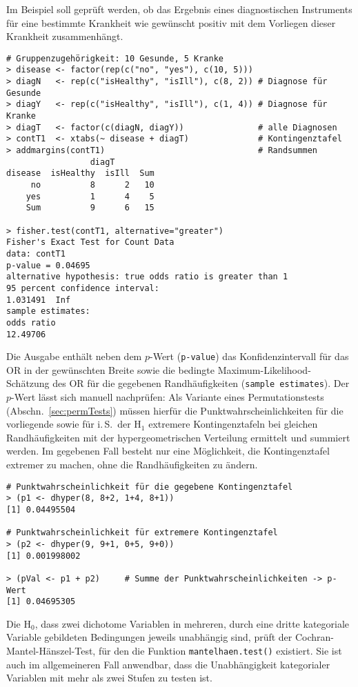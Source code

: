 Im Beispiel soll geprüft werden, ob das Ergebnis eines diagnostischen Instruments für eine bestimmte Krankheit wie gewünscht positiv mit dem Vorliegen dieser Krankheit zusammenhängt.
\begin{lstlisting}
# Gruppenzugehörigkeit: 10 Gesunde, 5 Kranke
> disease <- factor(rep(c("no", "yes"), c(10, 5)))
> diagN   <- rep(c("isHealthy", "isIll"), c(8, 2)) # Diagnose für Gesunde
> diagY   <- rep(c("isHealthy", "isIll"), c(1, 4)) # Diagnose für Kranke
> diagT   <- factor(c(diagN, diagY))               # alle Diagnosen
> contT1  <- xtabs(~ disease + diagT)              # Kontingenztafel
> addmargins(contT1)                               # Randsummen
                 diagT
disease  isHealthy  isIll  Sum
     no          8      2   10
    yes          1      4    5
    Sum          9      6   15

> fisher.test(contT1, alternative="greater")
Fisher's Exact Test for Count Data
data: contT1
p-value = 0.04695
alternative hypothesis: true odds ratio is greater than 1
95 percent confidence interval:
1.031491  Inf
sample estimates:
odds ratio
12.49706
\end{lstlisting}

Die Ausgabe enthält neben dem $p$-Wert (\lstinline!p-value!) das Konfidenzintervall für das OR in der gewünschten Breite sowie die bedingte Maximum-Likelihood-Schätzung des OR für die gegebenen Randhäufigkeiten (\lstinline!sample estimates!). Der $p$-Wert lässt sich manuell nachprüfen: Als Variante eines Permutationstests (Abschn.\ \ref{sec:permTests}) müssen hierfür die Punktwahrscheinlichkeiten für die vorliegende sowie für i.\,S.\ der $\text{H}_{1}$ extremere Kontingenztafeln bei gleichen Randhäufigkeiten mit der hypergeometrischen Verteilung ermittelt und summiert werden. Im gegebenen Fall besteht nur eine Möglichkeit, die Kontingenztafel extremer zu machen, ohne die Randhäufigkeiten zu ändern.
\begin{lstlisting}
# Punktwahrscheinlichkeit für die gegebene Kontingenztafel
> (p1 <- dhyper(8, 8+2, 1+4, 8+1))
[1] 0.04495504

# Punktwahrscheinlichkeit für extremere Kontingenztafel
> (p2 <- dhyper(9, 9+1, 0+5, 9+0))
[1] 0.001998002

> (pVal <- p1 + p2)     # Summe der Punktwahrscheinlichkeiten -> p-Wert
[1] 0.04695305
\end{lstlisting}

Die $\text{H}_{0}$, dass zwei dichotome Variablen in mehreren, durch eine dritte kategoriale Variable gebildeten Bedingungen jeweils unabhängig sind, prüft der Cochran-Mantel-Hänszel-Test, für den die Funktion \lstinline!mantelhaen.test()! existiert. Sie ist auch im allgemeineren Fall anwendbar, dass die Unabhängigkeit kategorialer Variablen mit mehr als zwei Stufen zu testen ist.

